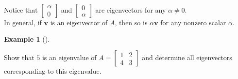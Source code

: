 \documentclass[
  a4paper,
  DIV=11,
  numbers=noendperiod,
  oneside]{scrreprt}
\theoremstyle{definition}
\newtheorem{example}{Example}[chapter]
\theoremstyle{remark}
\begin{document}
Notice that \(\left[\begin{array}{c} \alpha \\ 0 \end{array}\right]\)
and \(\left[\begin{array}{c} 0 \\ \alpha \end{array}\right]\) are
eigenvectors for any \(\alpha \neq 0\).\\
In general, if \(\mathbf{v}\) is an eigenvector of \(A\), then so is
\(\alpha \mathbf{v}\) for any nonzero scalar \(\alpha\).

\begin{example}[]\protect\hypertarget{exm-}{}\label{exm-}

Show that \(5\) is an eigenvalue of
\(A = \left[\begin{array}{cc} 1 & 2 \\ 4 & 3 \end{array}\right]\) and
determine all eigenvectors corresponding to this eigenvalue.

\end{example}
\end{document}
